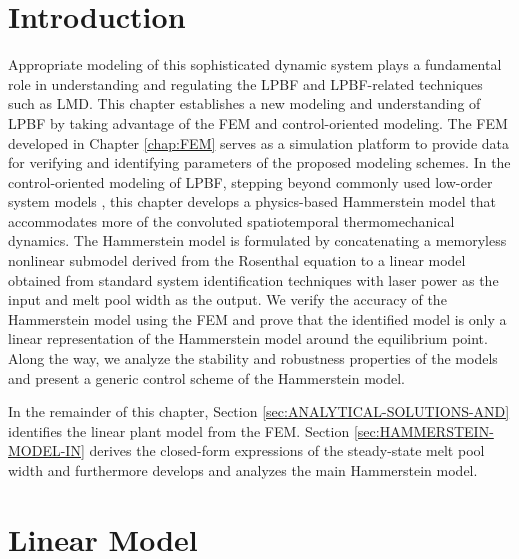 \documentclass [11pt, proquest] {uwthesis}[2020/02/24]
\begin{document}
\section{Introduction}

Appropriate modeling of this sophisticated
dynamic system plays a fundamental role in understanding and regulating
the LPBF and LPBF-related techniques such as LMD. This chapter establishes a new modeling and understanding of LPBF by
taking advantage of the FEM and control-oriented modeling. The FEM developed in Chapter \ref{chap:FEM} serves as a simulation platform to provide data for verifying and identifying
parameters of the proposed modeling schemes. In the control-oriented
modeling of LPBF, stepping beyond commonly used low-order system models  \cite{kruth2007feedback,craeghs2010feedback,zheng2020distributed,song2011feedback,cao2015control,sammons2014repetitive}, this chapter develops a physics-based Hammerstein model that accommodates
more of the convoluted spatiotemporal thermomechanical dynamics. The
Hammerstein model is formulated by concatenating a memoryless nonlinear
submodel derived from the Rosenthal equation to a linear model obtained
from standard system identification techniques with laser power as
the input and melt pool width as the output. We verify the accuracy
of the Hammerstein model using the FEM and prove that the identified
model is only a linear representation of the Hammerstein model around
the equilibrium point. Along the way, we analyze the stability and
robustness properties of the models and present a generic control
scheme of the Hammerstein model.

In the remainder of this chapter, Section \ref{sec:ANALYTICAL-SOLUTIONS-AND}
identifies the linear plant model from the FEM. Section \ref{sec:HAMMERSTEIN-MODEL-IN}
derives the closed-form expressions of the steady-state melt pool
width and furthermore develops and analyzes the main Hammerstein model.

\section{\label{sec:ANALYTICAL-SOLUTIONS-AND}Linear Model}
\end{document}
